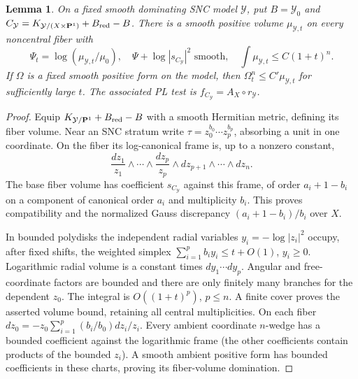 \documentclass[11pt]{article}
\newtheorem{lemma}[theorem]{Lemma}
\theoremstyle{remark}\newtheorem{remark}[theorem]{Remark}
\begin{document}
\begin{lemma}\label{lem:log-volume}
On a fixed smooth dominating SNC model $\mathcal Y$, put
$B=\mathcal Y_0$ and
$C_{\mathcal Y}=K_{\mathcal Y/(X\times\mathbf P^1)}+B_{\rm red}-B$.
There is a smooth positive volume $\mu_{\mathcal Y,t}$ on every
noncentral fiber with
\[
 \Psi_t=\log(\mu_{\mathcal Y,t}/\mu_0),\quad
 \Psi+\log|s_{C_{\mathcal Y}}|^2\text{ smooth},\quad
 \int\mu_{\mathcal Y,t}\leq C(1+t)^n.
\]
If $\Omega$ is a fixed smooth positive form on the model, then
$\Omega_t^n\leq C'\mu_{\mathcal Y,t}$ for sufficiently large $t$.
The associated PL test is $f_{C_{\mathcal Y}}=A_X\circ r_{\mathcal Y}$.
\end{lemma}
\begin{proof}
Equip $K_{\mathcal Y/\mathbf P^1}+B_{\rm red}-B$ with a smooth
Hermitian metric, defining its fiber volume. Near an SNC stratum
write $\tau=z_0^{b_0}\cdots z_p^{b_p}$, absorbing a unit in one
coordinate. On the fiber its log-canonical frame is, up to a nonzero
constant,
\[
 \frac{dz_1}{z_1}\wedge\cdots\wedge\frac{dz_p}{z_p}
           \wedge dz_{p+1}\wedge\cdots\wedge dz_n.
\]
The base fiber volume has coefficient $s_{C_{\mathcal Y}}$ against
this frame, of order $a_i+1-b_i$ on a component of canonical order
$a_i$ and multiplicity $b_i$. This proves compatibility and the
normalized Gauss discrepancy $(a_i+1-b_i)/b_i$ over $X$.

In bounded polydisks the independent radial variables
$y_i=-\log|z_i|^2$ occupy, after fixed shifts, the weighted simplex
$\sum_{i=1}^p b_i y_i\leq t+O(1)$, $y_i\geq0$. Logarithmic
radial volume is a constant times $dy_1\cdots dy_p$. Angular and
free-coordinate factors are bounded and there are only finitely many
branches for the dependent $z_0$. The integral is $O((1+t)^p)$,
$p\leq n$. A finite cover proves the asserted volume bound,
retaining all central multiplicities.
On each fiber
$dz_0=-z_0\sum_{i=1}^p(b_i/b_0)dz_i/z_i$.
Every ambient coordinate $n$-wedge has a bounded coefficient against
the logarithmic frame (the other coefficients contain products of
the bounded $z_i$). A smooth ambient positive form has bounded
coefficients in these charts, proving its fiber-volume domination.
\end{proof}
\end{document}
